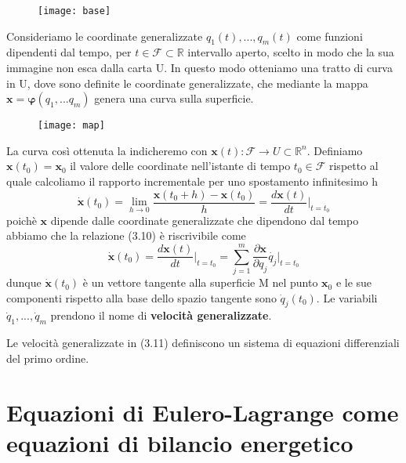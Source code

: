 \begin{figure}[!ht]
\vspace{0.1in}
\texttt{[image: base]}	
\centering
\end{figure}

Consideriamo le coordinate generalizzate $q_1(t),...,q_{m}(t)$ come funzioni dipendenti dal tempo, per $t \in \mathcal{F} \subset \mathbb{R}$ intervallo aperto, scelto in modo che la sua immagine non esca dalla carta U. In questo modo otteniamo una tratto di curva in U, dove sono definite le coordinate generalizzate, che mediante la mappa $\bm{x} = \bm{\varphi}(q_1,...q_m)$ genera una curva sulla superficie.
\newpage
\begin{figure}[!ht]
\vspace{0.1in}
\texttt{[image: map]}	
\centering
\end{figure}
La curva cos\`{i} ottenuta la indicheremo con $\bm{x}(t) : \mathcal{F} 
\rightarrow U \subset \mathbb{R}^n$. Definiamo $\bm{x}(t_0) = \bm{x}_0$ il valore delle coordinate nell'istante di tempo $t_0 \in \mathcal{F}$ rispetto al quale calcoliamo il rapporto incrementale per uno spostamento infinitesimo h
\begin{equation}
\bm{\dot{x}}\left(t_0\right)=\lim _{h \rightarrow 0} \frac{\mathbf{x}\left(t_0+h\right)-\mathbf{x}\left(t_0\right)}{h} = \frac{d \bm{x}(t)}{dt}\Big \vert_{t = t_0}
\end{equation}
poich\`{e} $\bm{x}$ dipende dalle coordinate generalizzate che dipendono dal tempo abbiamo che la relazione (3.10) \`{e} riscrivibile come
\begin{equation}
	\bm{\dot{x}}\left(t_0\right) = \frac{d \bm{x}(t)}{dt}\Big \vert_{t = t_0} = \sum_{j=1}^{m}\frac{\partial \bm{x}}{\partial q_j}\dot{q_j}\Big \vert_{t=t_0}
\end{equation}
dunque $\dot{\bm{x}}(t_0)$ \`{e} un vettore tangente alla superficie M nel punto $\bm{x}_0$ e le sue componenti rispetto alla base dello spazio tangente sono $\dot{q}_j(t_0)$. Le variabili $\dot{q}_1,...,\dot{q}_{m}$ prendono il nome di \textbf{velocit\`{a} generalizzate}.

\begin{remark}
Le velocit\`{a} generalizzate in (3.11) definiscono un sistema di equazioni differenziali del primo ordine.	
\end{remark}

\section{Equazioni di Eulero-Lagrange come equazioni di bilancio energetico}

